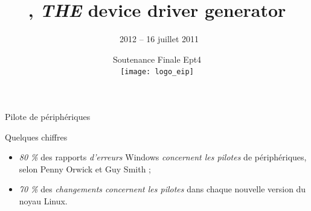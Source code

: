 \documentclass{beamer}
\title{\rtx, \emph{THE} device driver generator}
\date[Soutenance Finale Ept4]{Soutenance Finale Ept4 \\ \vspace{10pt} \texttt{[image: logo\_eip]}}
\author[\rtx\ 2012 -- 16 juillet 2011]{\rtx\ 2012 -- 16 juillet 2011 \vspace{-20pt}}
\newcommand{\cemph}[1]{{\itshape{\textcolor{rathaxesred}{#1}}}}
\begin{document}
\begin{frame}
\titlepage
\end{frame}

\begin{frame}{Pilote de périphériques}
\begin{center}


\end{center}
\end{frame}

\begin{frame}{Quelques chiffres}
\Large{
\begin{itemize}
\setlength{\itemsep}{1em}
\item {\LARGE \emph{80 \%}} des rapports \cemph{d'erreurs} Windows \cemph{concernent les pilotes} de périphériques, selon Penny Orwick et Guy Smith ;
\item {\LARGE \emph{70 \%}} des \cemph{changements concernent les pilotes} dans chaque nouvelle version du noyau Linux.
\end{itemize}
}
\end{frame}
\end{document}
